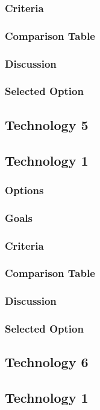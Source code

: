 \documentclass[10pt,draftclsnofoot,onecolumn]{IEEEtran}
\begin{document}
\subsubsection{Criteria}
\subsubsection{Comparison Table}
\subsubsection{Discussion}
\subsubsection{Selected Option}
\subsection{Technology 5}
\subsection{Technology 1}
\subsubsection{Options}
\subsubsection{Goals}
\subsubsection{Criteria}
\subsubsection{Comparison Table}
\subsubsection{Discussion}
\subsubsection{Selected Option}
\subsection{Technology 6}
\subsection{Technology 1}
\end{document}
